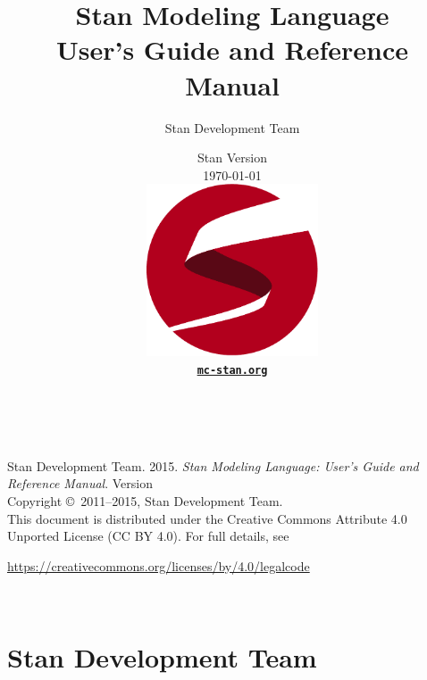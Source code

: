 \title{\Huge\bf Stan Modeling Language \\[4pt] {\LARGE User's Guide
    and Reference Manual}}
\author{Stan Development Team}

\date{\vspace*{36pt} Stan Version \stanversion
\\[8pt] {\small \today}
\\[36pt]
{
\vfill
\includegraphics[width=2in]{img/stanlogo-main.pdf}}
\\
\vspace*{6pt}
{\bfseries \href{http://mc-stan.org/}{\tt mc-stan.org}}
}
\maketitle

\newpage
\thispagestyle{empty}
\mbox{ }
\vfill
\begin{center}
\begin{minipage}[t]{0.75\textwidth}
\small
Stan Development Team. 2015.
{\it Stan Modeling Language: User's Guide and Reference Manual}. Version
\stanversion
\vspace*{20pt}
\mbox{ }
\\
Copyright \copyright \ 2011--2015, Stan Development Team.
\vspace*{28pt}
\mbox{} \\
This document is distributed under the Creative Commons Attribute 4.0
Unported License (CC BY 4.0).  For full details, see
\begin{center}
\url{https://creativecommons.org/licenses/by/4.0/legalcode}
\end{center}
\end{minipage}
\vspace*{24pt}
\mbox{ }
\end{center}

\newpage
\section*{Stan Development Team}

